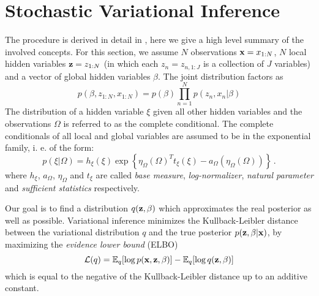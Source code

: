 \documentclass[12pt,abstracton,a4paper]{scrartcl}
\def\x{{\bf x}}
\def\z{{\bf z}}
\begin{document}
\section{Stochastic Variational Inference}
The procedure is derived in detail in \cite{Hoffman12}, here we give a high
level summary of the involved concepts. For this section, we assume $N$ observations ${\bf x}=x_{1:N}$, $N$
local hidden variables ${\bf z}=z_{1:N}$ (in which each $z_n = z_{n,1:J}$ is a
collection of $J$ variables) and a vector of global hidden variables
$\beta$. The joint distribution factors as
\begin{equation}
    p(\beta, z_{1:N}, x_{1:N}) = p(\beta) \prod_{n=1}^N p(z_n,x_n|\beta)
\end{equation}
The distribution of a hidden variable $\xi$ given all other hidden variables and the
observations $\Omega$ is referred to as the complete conditional. The complete conditionals 
of all local and global variables are assumed to be in the exponential family, 
i. e. of the form:
\begin{equation}
    p(\xi|\Omega) =  h_\xi (\xi) \exp \left\{ \eta_\Omega(\Omega)^T t_\xi(\xi) -
        a_\Omega(\eta_\Omega(\Omega))
    \right\} \, .
\end{equation}
where $h_\xi$, $a_\Omega$, $\eta_\Omega$ and $t_\xi$ are called \textit{base
measure}, \textit{log-normalizer}, \textit{natural parameter} and
\textit{sufficient statistics} respectively.

Our goal is to find a distribution $q({\bf z}, \beta)$ which approximates the real posterior as
well as possible. Variational inference minimizes the Kullback-Leibler distance
between the variational distribution $q$ and the true posterior $p({\bf z}, \beta | {\bf
x})$, by maximizing the \textit{evidence lower bound} (ELBO)
\begin{equation}
\mathcal{L}(q) = \mathbb{E}_q[\log p(\x,\z,\beta)] - \mathbb{E}_q[\log q(\z,\beta)]
\end{equation}
which is equal to
the negative of the Kullback-Leibler distance up to an additive constant.
\end{document}
